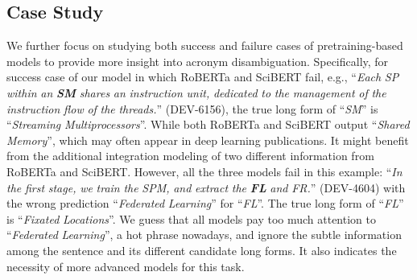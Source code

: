 \subsection{Case Study}
\begin{table*}
    \centering
    \caption{Examples of noise data of SciAD dataset.}
    \label{tab:noise}
\end{table*}

We further focus on studying both success and failure cases of pretraining-based models to provide more insight into acronym disambiguation. 
Specifically, for success case of our model in which RoBERTa and SciBERT fail,
e.g., ``\textit{Each} \textit{SP} \textit{within} \textit{an} \textit{\textbf{SM}} \textit{shares} \textit{an} \textit{instruction} \textit{unit,} \textit{dedicated} \textit{to} \textit{the} \textit{management} \textit{of} \textit{the} \textit{instruction} \textit{flow} \textit{of} \textit{the} \textit{threads.}'' (DEV-6156), the true long form of ``\textit{SM}'' is
``\textit{Streaming} \textit{Multiprocessors}''. While both RoBERTa and SciBERT output ``\textit{Shared} \textit{Memory}'', which may often appear in deep learning publications. 
It might benefit from the additional integration modeling of two different information from RoBERTa and SciBERT.
However, all the three models fail in this example: ``\textit{In} \textit{the} \textit{first} \textit{stage,} \textit{we} \textit{train} \textit{the} \textit{SPM,} \textit{and} \textit{extract} \textit{the} \textit{\textbf{FL}} \textit{and} \textit{FR.}'' (DEV-4604) with the wrong prediction ``\textit{Federated} \textit{Learning}'' for ``\textit{FL}''. The true long form of ``\textit{FL}'' is ``\textit{Fixated} \textit{Locations}''. 
We guess that all models pay too much attention to ``\textit{Federated} \textit{Learning}'', a hot phrase nowadays, and ignore the subtle information among the sentence and its different candidate long forms.
It also indicates the necessity of more advanced models for this task.

